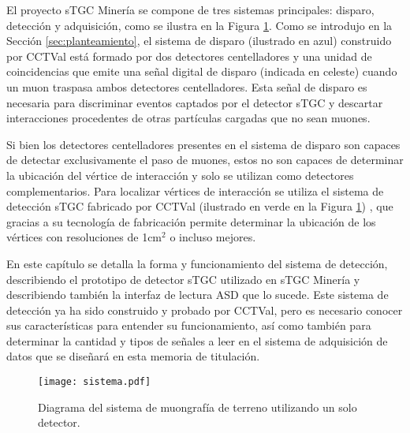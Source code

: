 El proyecto sTGC Minería se compone de tres sistemas principales: disparo, detección y adquisición, como se ilustra en la Figura \ref{fig:sistema-completo}. Como se introdujo en la Sección \ref{sec:planteamiento}, el sistema de disparo \cite{Oyanadel2020SistemaSTGC} (ilustrado en azul) construido por CCTVal está formado por dos detectores centelladores y una unidad de coincidencias que emite una señal digital de disparo (indicada en celeste) cuando un muon traspasa ambos detectores centelladores. Esta señal de disparo es necesaria para discriminar eventos captados por el detector sTGC y descartar interacciones procedentes de otras partículas cargadas que no sean muones. 
	
Si bien los detectores centelladores presentes en el sistema de disparo son capaces de detectar exclusivamente el paso de muones, estos no son capaces de determinar la ubicación del vértice de interacción y solo se utilizan como detectores complementarios. Para localizar vértices de interacción se utiliza el sistema de detección sTGC fabricado por CCTVal (ilustrado en verde en la Figura \ref{fig:sistema-completo}) , que gracias a su tecnología de fabricación permite determinar la ubicación de los vértices con resoluciones de 1cm$^2$ o incluso mejores.
	
En este capítulo se detalla la forma y funcionamiento del sistema de detección, describiendo el prototipo de detector sTGC utilizado en sTGC Minería y describiendo también la interfaz de lectura ASD  que lo sucede.  Este sistema de detección ya ha sido construido y probado por CCTVal, pero es necesario conocer sus características para entender su funcionamiento, así como también para determinar la cantidad y tipos de señales a leer en el sistema de adquisición de datos que se diseñará en esta memoria de titulación.
	

 

	\begin{figure}[h]
		\centering
		\texttt{[image: sistema.pdf]}
		\caption{Diagrama del sistema de muongrafía de terreno utilizando un solo detector.}
		\label{fig:sistema-completo}
	\end{figure}